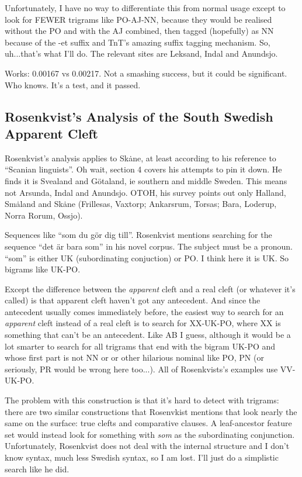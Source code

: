 Unfortunately, I have no way to differentiate this from normal usage
except to look for FEWER trigrams like PO-AJ-NN, because they would be
realised without the PO and with the AJ combined, then tagged
(hopefully) as NN because of the -et suffix and TnT's amazing suffix
tagging mechanism. So, uh...that's what I'll do. The relevant sites
are Leksand, Indal and Anundsjo.

Works: 0.00167 vs 0.00217. Not a smashing success, but it could be
significant. Who knows. It's a test, and it passed.

\subsection{Rosenkvist's Analysis of the South Swedish Apparent Cleft}

Rosenkvist's analysis applies to Sk\.ane, at least according to his
reference to ``Scanian linguists''. Oh wait, section 4 covers his
attempts to pin it down. He finds it is Svealand and G\"otaland, ie
southern and middle Sweden. This means not Arsunda, Indal and
Anundsjo.
OTOH, his survey points out only Halland,
Sm\.aland and Sk\.ane (Frillesas, Vaxtorp; Ankarsrum, Torsas; Bara,
Loderup, Norra Rorum, Ossjo).

Sequences like ``som du g\"or dig till''. Rosenkvist mentions
searching for the sequence ``det \"ar bara som'' in his novel
corpus. The subject must be a pronoun. ``som'' is either UK
(subordinating conjuction) or PO. I think here it is UK. So bigrams
like UK-PO.

Except the difference between the {\it apparent} cleft and a real
cleft (or whatever it's called) is that apparent cleft haven't got any
antecedent. And since the antecedent usually comes immediately before,
the easiest way to search for an {\it apparent} cleft instead of a
real cleft is to search for XX-UK-PO, where XX is something that can't
be an antecedent. Like AB I guess, although it would be a lot smarter
to search for all trigrams that end with the bigram UK-PO and whose
first part is not NN or or other hilarious nominal like PO, PN (or
seriously, PR would be wrong here too...). All of Rosenkvists's
examples use VV-UK-PO.

The problem with this construction is that it's hard to detect with
trigrams: there are two similar constructions that Rosenvkist mentions
that look nearly the same on the surface: true clefts and comparative
clauses. A leaf-ancestor feature set would instead look for something
with {\it som} as the subordinating conjunction. Unfortunately,
Rosenkvist does not deal with the internal structure and I don't know
syntax, much less Swedish syntax, so I am lost. I'll just do a
simplistic search like he did.

